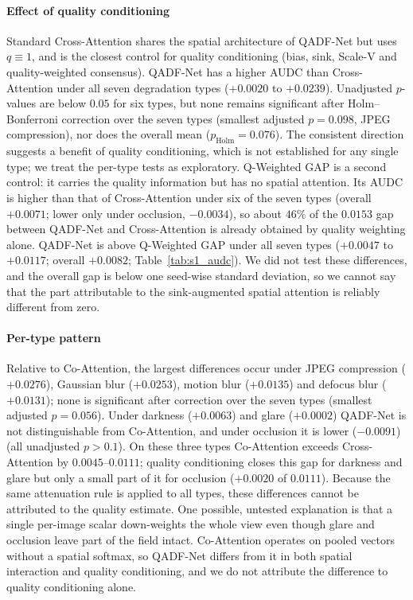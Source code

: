 \documentclass[final,5p,times,twocolumn,authoryear]{elsarticle}
\newcommand{\qadfnet}{QADF-Net}
\theoremstyle{plain}
\theoremstyle{remark}
\begin{document}
\paragraph{Effect of quality conditioning} Standard Cross-Attention shares the spatial architecture of \qadfnet{} but uses $q\equiv1$, and is the closest control for quality conditioning (bias, sink, Scale-V and quality-weighted consensus). \qadfnet{} has a higher AUDC than Cross-Attention under all seven degradation types ($+0.0020$ to $+0.0239$). Unadjusted $p$-values are below $0.05$ for six types, but none remains significant after Holm--Bonferroni correction over the seven types (smallest adjusted $p=0.098$, JPEG compression), nor does the overall mean ($p_{\text{Holm}}=0.076$). The consistent direction suggests a benefit of quality conditioning, which is not established for any single type; we treat the per-type tests as exploratory. Q-Weighted GAP is a second control: it carries the quality information but has no spatial attention. Its AUDC is higher than that of Cross-Attention under six of the seven types (overall $+0.0071$; lower only under occlusion, $-0.0034$), so about $46\%$ of the $0.0153$ gap between \qadfnet{} and Cross-Attention is already obtained by quality weighting alone. \qadfnet{} is above Q-Weighted GAP under all seven types ($+0.0047$ to $+0.0117$; overall $+0.0082$; Table~\ref{tab:s1_audc}). We did not test these differences, and the overall gap is below one seed-wise standard deviation, so we cannot say that the part attributable to the sink-augmented spatial attention is reliably different from zero.

\paragraph{Per-type pattern} Relative to Co-Attention, the largest differences occur under JPEG compression ($+0.0276$), Gaussian blur ($+0.0253$), motion blur ($+0.0135$) and defocus blur ($+0.0131$); none is significant after correction over the seven types (smallest adjusted $p=0.056$). Under darkness ($+0.0063$) and glare ($+0.0002$) \qadfnet{} is not distinguishable from Co-Attention, and under occlusion it is lower ($-0.0091$) (all unadjusted $p>0.1$). On these three types Co-Attention exceeds Cross-Attention by $0.0045$--$0.0111$; quality conditioning closes this gap for darkness and glare but only a small part of it for occlusion ($+0.0020$ of $0.0111$). Because the same attenuation rule is applied to all types, these differences cannot be attributed to the quality estimate. One possible, untested explanation is that a single per-image scalar down-weights the whole view even though glare and occlusion leave part of the field intact. Co-Attention operates on pooled vectors without a spatial softmax, so \qadfnet{} differs from it in both spatial interaction and quality conditioning, and we do not attribute the difference to quality conditioning alone.
\end{document}

